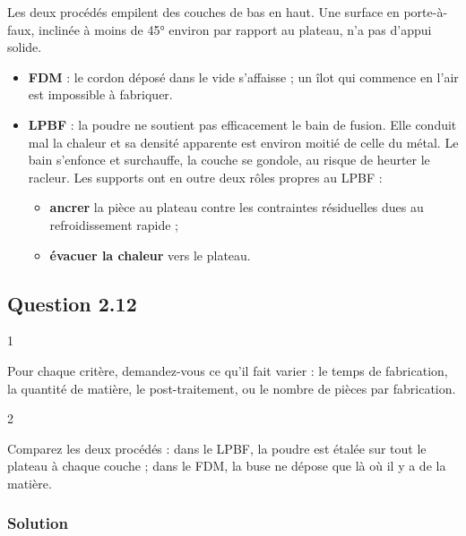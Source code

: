 \documentclass[11pt,a4paper]{article}
\providecommand{\tightlist}{\setlength{\itemsep}{0pt}\setlength{\parskip}{0pt}}
\begin{document}
Les deux procédés empilent des couches de bas en haut. Une surface en porte-à-faux, inclinée à moins de 45° environ par rapport au plateau, n'a pas d'appui solide.

\begin{itemize}
\tightlist
\item
  \textbf{FDM} : le cordon déposé dans le vide s'affaisse ; un îlot qui commence en l'air est impossible à fabriquer.
\item
  \textbf{LPBF} : la poudre ne soutient pas efficacement le bain de fusion. Elle conduit mal la chaleur et sa densité apparente est environ moitié de celle du métal. Le bain s'enfonce et surchauffe, la couche se gondole, au risque de heurter le racleur. Les supports ont en outre deux rôles propres au LPBF :

  \begin{itemize}
  \tightlist
  \item
    \textbf{ancrer} la pièce au plateau contre les contraintes résiduelles dues au refroidissement rapide ;
  \item
    \textbf{évacuer la chaleur} vers le plateau.
  \end{itemize}
\end{itemize}

\hypertarget{question-2.12}{%
\subsection{Question 2.12}\label{question-2.12}}

\begin{indication}{1}

Pour chaque critère, demandez-vous ce qu'il fait varier : le temps de fabrication, la quantité de matière, le post-traitement, ou le nombre de pièces par fabrication.

\end{indication}

\begin{indication}{2}

Comparez les deux procédés : dans le LPBF, la poudre est étalée sur tout le plateau à chaque couche ; dans le FDM, la buse ne dépose que là où il y a de la matière.

\end{indication}

\hypertarget{solution-25}{%
\subsubsection{Solution}\label{solution-25}}
\end{document}
